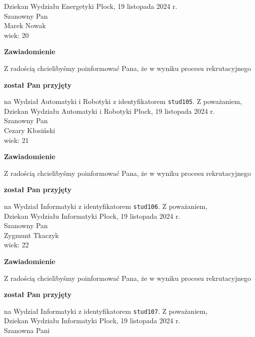 \documentclass[12pt,a4paper]{article}
\begin{document}
Dziekan
Wydziału Energetyki
\newpage
\hfill Płock, 19 listopada 2024 r. \\
\noindent
Szanowny Pan \\
Marek Nowak \\
wiek: 20
\bigskip
\begin{center}
    {\Large\textbf{Zawiadomienie}}
\end{center}
\bigskip 
Z radością chcielibyśmy poinformować Pana, że w wyniku procesu rekrutacyjnego
\begin{center}
\textsf{\textbf{został Pan przyjęty}}
\end{center}
na Wydział Automatyki i Robotyki z identyfikatorem \verb|stud105|. 
\vspace{2cm}
\noindent
Z poważaniem, \\
Dziekan
Wydziału Automatyki i Robotyki
\newpage
\hfill Płock, 19 listopada 2024 r. \\
\noindent
Szanowny Pan \\
Cezary Kłosiński \\
wiek: 21
\bigskip
\begin{center}
    {\Large\textbf{Zawiadomienie}}
\end{center}
\bigskip 
Z radością chcielibyśmy poinformować Pana, że w wyniku procesu rekrutacyjnego
\begin{center}
\textsf{\textbf{został Pan przyjęty}}
\end{center}
na Wydział Informatyki z identyfikatorem \verb|stud106|. 
\vspace{2cm}
\noindent
Z poważaniem, \\
Dziekan
Wydziału Informatyki
\newpage
\hfill Płock, 19 listopada 2024 r. \\
\noindent
Szanowny Pan \\
Zygmunt Tkaczyk \\
wiek: 22
\bigskip
\begin{center}
    {\Large\textbf{Zawiadomienie}}
\end{center}
\bigskip 
Z radością chcielibyśmy poinformować Pana, że w wyniku procesu rekrutacyjnego
\begin{center}
\textsf{\textbf{został Pan przyjęty}}
\end{center}
na Wydział Informatyki z identyfikatorem \verb|stud107|. 
\vspace{2cm}
\noindent
Z poważaniem, \\
Dziekan
Wydziału Informatyki
\newpage
\hfill Płock, 19 listopada 2024 r. \\
\noindent
Szanowna Pani \\
\end{document}
